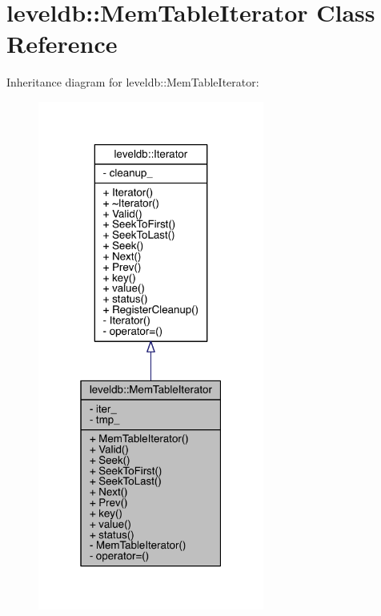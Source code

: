 \hypertarget{classleveldb_1_1_mem_table_iterator}{}\section{leveldb\+:\+:Mem\+Table\+Iterator Class Reference}
\label{classleveldb_1_1_mem_table_iterator}


Inheritance diagram for leveldb\+:\+:Mem\+Table\+Iterator\+:\nopagebreak
\begin{figure}[H]
\begin{center}
\leavevmode
\includegraphics[width=211pt]{classleveldb_1_1_mem_table_iterator__inherit__graph}
\end{center}
\end{figure}



